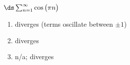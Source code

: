 {$\ds \sum_{n=1}^\infty \cos \big(\pi n\big)$
}
{\begin{enumerate}
	\item diverges (terms oscillate between $\pm 1$)
	\item	diverges
	\item n/a; diverges
\end{enumerate}
}